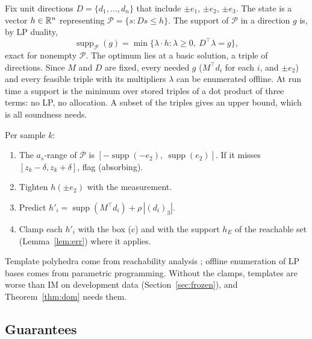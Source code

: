 Fix unit directions $D = \{d_1,\dots,d_n\}$ that include $\pm e_1$, $\pm e_2$, $\pm e_3$. The state is a vector
$h\in\mathbb{R}^n$ representing $\mathcal{P} = \{s : Ds\le h\}$. The support of $\mathcal{P}$ in a direction $g$ is, by LP
duality,
\[
\operatorname{supp}_{\mathcal{P}}(g) = \min\{\lambda\cdot h : \lambda\ge0,\ D^\top\lambda = g\},
\]
exact for nonempty $\mathcal{P}$. The optimum lies at a basic solution, a triple of directions. Since $M$ and $D$ are
fixed, every needed $g$ ($M^\top d_i$ for each $i$, and $\pm e_2$) and every feasible triple with its multipliers
$\lambda$ can be enumerated offline. At run time a support is the minimum over stored triples of a dot product of three
terms: no LP, no allocation. A subset of the triples gives an upper bound, which is all soundness needs.

Per sample $k$:
\begin{enumerate}
\item The $a_s$-range of $\mathcal{P}$ is $[-\operatorname{supp}(-e_2),\ \operatorname{supp}(e_2)]$. If it misses
  $[z_k-\delta, z_k+\delta]$, flag (absorbing).
\item Tighten $h(\pm e_2)$ with the measurement.
\item Predict $h'_i = \operatorname{supp}(M^\top d_i) + \rho\,|(d_i)_3|$.
\item Clamp each $h'_i$ with the box (c) and with the support $h_E$ of the reachable set (Lemma~\ref{lem:err}) where it
  applies.
\end{enumerate}
Template polyhedra come from reachability analysis \citep{sankaranarayanan2008}; offline enumeration of LP bases comes
from parametric programming. Without the clamps, templates are worse than IM on development data
(Section~\ref{sec:frozen}), and Theorem~\ref{thm:dom} needs them.

\subsection{Guarantees}


